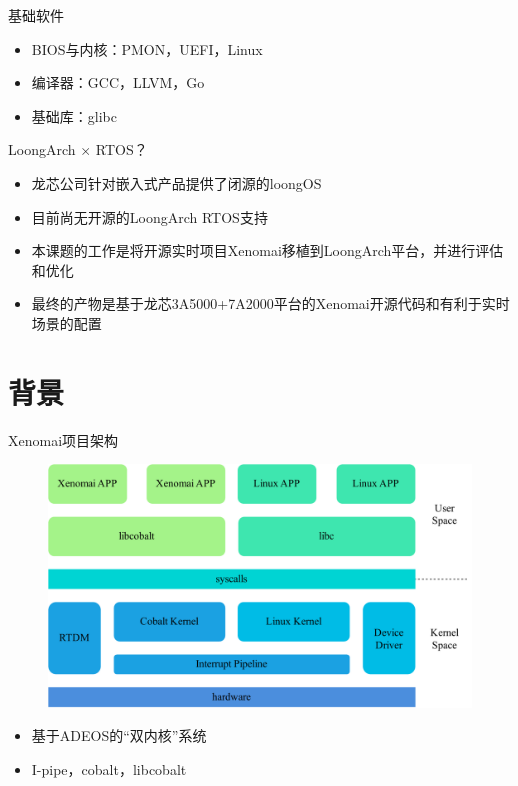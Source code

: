 \documentclass{beamer}
\begin{document}
\begin{frame}{基础软件}
    \begin{itemize}
        \item BIOS与内核：PMON，UEFI，Linux
        \item 编译器：GCC，LLVM，Go
        \item 基础库：glibc
    \end{itemize}
\end{frame}

\begin{frame}{LoongArch $\times$ RTOS？}
    \begin{itemize}
        \item 龙芯公司针对嵌入式产品提供了闭源的loongOS
        \item 目前尚无开源的LoongArch RTOS支持
        \item 本课题的工作是将开源实时项目Xenomai移植到LoongArch平台，并进行评估和优化
        \item 最终的产物是基于龙芯3A5000+7A2000平台的Xenomai开源代码和有利于实时场景的配置
    \end{itemize}
\end{frame}

\section{背景}

\begin{frame}{Xenomai项目架构}
    \begin{minipage}{0.45\linewidth}
        \begin{figure}[h]
            \centering
            \includegraphics[height=.45\textheight]{img/Img/xenomai-prj.pdf}
        \end{figure}
    \end{minipage}\hspace{1.5cm}
    \begin{minipage}{0.35\linewidth}
        \begin{itemize}
            \item 基于ADEOS的“双内核”系统
            \item I-pipe，cobalt，libcobalt
        \end{itemize}
    \end{minipage}
    \medskip
\end{frame}
\end{document}
